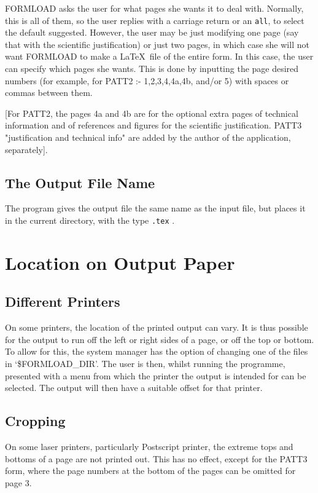 FORMLOAD asks the user for what pages she wants it to deal with.
Normally, this is all of them, so the user replies with a carriage return or
an {\tt all}, to select the default suggested. However, the user may be just
modifying one page (say that with the scientific justification) or just two
pages, in which case she will not want FORMLOAD to make a \LaTeX\
file of the entire form. In this case, the user can specify which pages she
wants. This is done by inputting the page desired numbers (for example, for
PATT2 :- 1,2,3,4,4a,4b, and/or 5) with spaces or commas between them.

[For PATT2, the pages 4a and 4b are for the optional extra pages
of technical information and of references and figures for the scientific
justification. PATT3 "justification and technical info" are added by the
author of the application, separately].

\subsection{The Output File Name}

The program gives the output file the same name as the input file,
but places it in the current directory, with the type {\tt .tex} .

\section{Location on Output Paper}
\label{se:locate}

\subsection{Different Printers}

On some printers, the location of the printed output can vary. It is thus
possible for the output to run off the left or right sides of a page, or
off the top or bottom. To allow for this, the system manager has the option
of changing one of the files in `\$FORMLOAD\_DIR'. The user is then, whilst
running the programme, presented with a menu from which the printer the
output is intended for can be selected. The output will then have a
suitable offset for that printer.


\subsection{Cropping}

On some laser printers, particularly Postscript printer, the extreme tops
and bottoms of a page are not printed out. This has no effect, except for
the PATT3 form, where the page numbers at the bottom of the pages can be
omitted for page 3.


